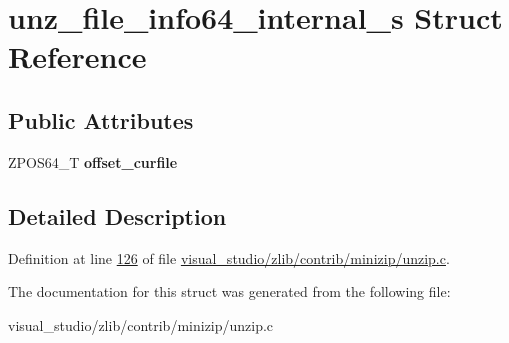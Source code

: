 \hypertarget{structunz__file__info64__internal__s}{}\section{unz\+\_\+file\+\_\+info64\+\_\+internal\+\_\+s Struct Reference}
\label{structunz__file__info64__internal__s}
\subsection*{Public Attributes}
\begin{DoxyCompactItemize}
\item 
\mbox{\label{structunz__file__info64__internal__s_a8a6ef9b7a073f5eea39f7bd7432f0042}} 
Z\+P\+O\+S64\+\_\+T {\bfseries offset\+\_\+curfile}
\end{DoxyCompactItemize}


\subsection{Detailed Description}


Definition at line \hyperlink{visual__studio_2zlib_2contrib_2minizip_2unzip_8c_source_l00126}{126} of file \hyperlink{visual__studio_2zlib_2contrib_2minizip_2unzip_8c_source}{visual\+\_\+studio/zlib/contrib/minizip/unzip.\+c}.



The documentation for this struct was generated from the following file\+:\begin{DoxyCompactItemize}
\item 
visual\+\_\+studio/zlib/contrib/minizip/unzip.\+c\end{DoxyCompactItemize}
